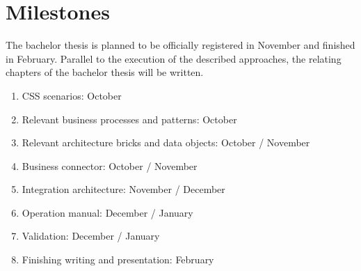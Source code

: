 \documentclass{article}
\begin{document}
\section{Milestones}

The bachelor thesis is planned to be officially registered in November and finished in February.
Parallel to the execution of the described approaches, the relating chapters of the bachelor thesis will be written.

\begin{enumerate}
    \item CSS scenarios: October
    \item Relevant business processes and patterns: October
    \item Relevant architecture bricks and data objects: October / November
    \item Business connector: October / November
    \item Integration architecture: November / December
    \item Operation manual: December / January
    \item Validation: December / January
    \item Finishing writing and presentation: February
\end{enumerate}

\printbibliography
\end{document}
